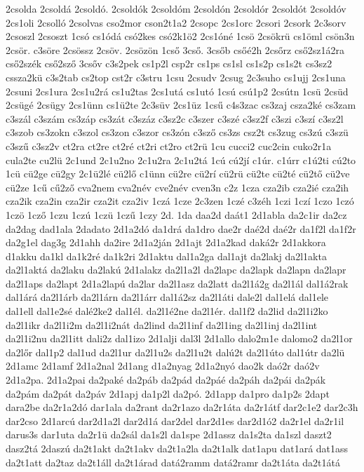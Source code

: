 {2csolda
2csoldá
2csoldó.
2csoldók
2csoldóm
2csoldón
2csoldór
2csoldót
2csoldóv
2cs1oli
2csolló
2csolvas
cso2mor
cson2t1a2
2csopc
2cs1orc
2csori
2csork
2c3sorv
2csoszl
2csoszt
1csó
cs1ódá
csó2kes
csó2k1ö2
2cs1óné
1csö
2csökrü
cs1öml
csön3n
2csör.
c3söre
2csössz
2csöv.
2csözön
1cső
3cső.
3csőb
csőé2h
2csőrz
cső2sz1á2ra
cső2szék
cső2sző
3csőv
c3s2pek
cs1p2l
csp2r
cs1ps
cs1sl
cs1s2p
cs1s2t
cs3sz2
cssza2kü
c3s2tab
cs2top
cst2r
c3stru
1csu
2csudv
2csug
2c3suho
cs1ujj
2cs1una
2csuni
2cs1ura
2cs1u2rá
cs1u2tas
2cs1utá
cs1utó
1csú
csú1p2
2csútn
1csü
2csüd
2csügé
2csügy
2cs1ünn
cs1ü2te
2c3süv
2cs1üz
1csű
c4s3zac
cs3zaj
csza2ké
cs3zam
c3szál
c3szám
cs3záp
cs3zát
c3száz
c3sz2c
c3szer
c3szé
c3sz2f
c3szi
c3szí
c3sz2l
c3szob
cs3zokn
c3szol
cs3zon
c3szor
cs3zón
c3sző
cs3zs
csz2t
cs3zug
cs3zú
c3szü
c3szű
c3sz2v
ct2ra
ct2re
ct2ré
ct2ri
ct2ro
ct2rü
1cu
cucci2
cuc2cin
cuko2r1a
cula2te
cu2lü
2c1und
2c1u2no
2c1u2ra
2c1u2tá
1cú
cú2jí
c1úr.
c1úrr
c1ú2ti
cú2to
1cü
cü2ge
cü2gy
2c1ü2lé
cü2lő
c1ünn
cü2re
cü2rí
cü2rü
cü2te
cü2té
cü2tő
cü2ve
cü2ze
1cű
cű2ző
cva2nem
cva2név
cve2név
cven3n
c2z
1cza
cza2ib
cza2ié
cza2ih
cza2ik
cza2in
cza2ir
cza2it
cza2iv
1czá
1cze
2c3zen
1czé
c3zéh
1czi
1czí
1czo
1czó
1czö
1cző
1czu
1czú
1czü
1czű
1czy
2d.
1da
daa2d
daát1
2d1abla
da2c1ir
da2cz
da2dag
dad1ala
2dadato
2d1a2dó
da1drá
da1dro
dae2r
daé2d
daé2r
da1f2l
da1f2r
da2g1el
dag3g
2d1ahh
da2ire
2d1a2ján
2d1ajt
2d1a2kad
daká2r
2d1akkora
d1akku
da1kl
da1k2ré
da1k2ri
2d1aktu
dal1a2ga
dal1ajt
da2lakj
da2l1akta
da2l1aktá
da2laku
da2lakú
2d1alakz
da2l1a2l
da2lapc
da2lapk
da2lapn
da2lapr
da2l1aps
da2lapt
2d1a2lapú
da2lar
da2l1asz
da2latt
da2l1á2g
da2l1ál
dal1á2rak
dal1árá
da2l1árb
da2l1árn
da2l1árr
dal1á2sz
da2l1áti
dale2l
dal1elá
dal1ele
dal1ell
dal1e2sé
dalé2ke2
dal1él.
da2l1é2ne
da2l1ér.
dal1f2
da2lid
da2l1i2ko
da2l1ikr
da2l1i2m
da2l1i2nát
da2lind
da2l1inf
da2l1ing
da2l1inj
da2l1int
da2l1i2nu
da2l1itt
dali2z
dal1izo
2d1alji
dal3l
2d1allo
dalo2m1e
dalomo2
da2l1or
da2lőr
dal1p2
dal1ud
da2l1ur
da2l1u2s
da2l1u2t
dalú2t
da2l1úto
dal1útr
da2lü
2d1amc
2d1amf
2d1a2nal
2d1ang
d1a2nyag
2d1a2nyó
dao2k
daó2r
daó2v
2d1a2pa.
2d1a2pai
da2paké
da2páb
da2pád
da2páé
da2páh
da2pái
da2pák
da2pám
da2pát
da2páv
2d1apj
da1p2l
da2pó.
2d1app
da1pro
da1p2s
2dapt
dara2be
da2r1a2dó
dar1ala
da2rant
da2r1azo
da2r1áta
da2r1átf
dar2c1e2
dar2c3h
dar2cso
2d1arcú
dar2d1a2l
dar2d1á
dar2del
dar2d1es
dar2d1ó2
da2r1el
da2r1il
darus3s
dar1uta
da2r1ü
da2sál
da1s2l
da1spe
2d1assz
da1s2ta
da1szl
daszt2
dasz2tá
2daszú
da2t1akt
da2t1akv
da2t1a2la
da2t1alk
dat1apu
dat1ará
dat1ass
da2t1att
da2taz
da2t1áll
da2t1árad
datá2ramm
datá2ramr
da2t1áta
da2t1átá
}

